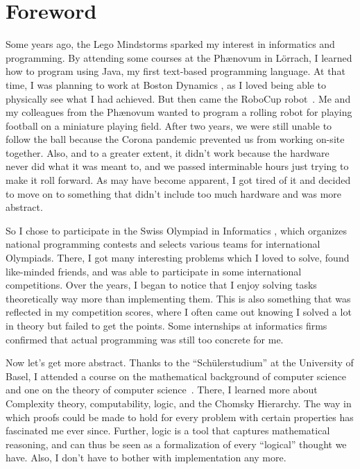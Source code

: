 \chapter*{Foreword}

Some years ago, the Lego Mindstorms \cite{lego} sparked my interest in informatics and programming.
By attending some courses at the Phænovum \cite{phaenovum} in Lörrach, I learned how to program using Java, my first text-based programming language.
At that time, I was planning to work at Boston Dynamics \cite{boston}, as I loved being able to physically see what I had achieved.
But then came the RoboCup robot~\cite{roboCup}.
Me and my colleagues from the Phænovum wanted to program a rolling robot for playing football on a miniature playing field.
After two years, we were still unable to follow the ball because the Corona pandemic prevented us from working on-site together.
Also, and to a greater extent, it didn't work because the hardware never did what it was meant to, and we passed interminable hours just trying to make it roll forward.
As may have become apparent, I got tired of it and decided to move on to something that didn't include too much hardware and was more abstract.

So I chose to participate in the Swiss Olympiad in Informatics \cite{soi}, which organizes national programming contests and selects various teams for international Olympiads.
There, I got many interesting problems which I loved to solve, found like-minded friends, and was able to participate in some international competitions.
Over the years, I began to notice that I enjoy solving tasks theoretically way more than implementing them.
This is also something that was reflected in my competition scores, where I often came out knowing I solved a lot in theory but failed to get the points.
Some internships at informatics firms confirmed that actual programming was still too concrete for me.

Now let's get more abstract.
Thanks to the ``Schülerstudium'' at the University of Basel, I attended a course on the mathematical background of computer science~\cite{discrete-maths} and one on the theory of computer science~\cite{theory-cs}.
There, I learned more about Complexity theory, computability, logic, and the Chomsky Hierarchy.
The way in which proofs could be made to hold for every problem with certain properties has fascinated me ever since.
Further, logic is a tool that captures mathematical reasoning, and can thus be seen as a formalization of every ``logical'' thought we have.
Also, I don't have to bother with implementation any more.

